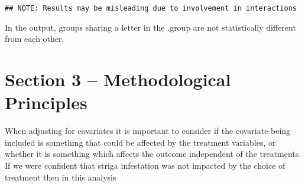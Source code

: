 \documentclass[]{book}
\theoremstyle{definition}
\theoremstyle{definition}
\theoremstyle{definition}
\theoremstyle{remark}
\begin{document}
\begin{verbatim}
## NOTE: Results may be misleading due to involvement in interactions
\end{verbatim}

In the output, groups sharing a letter in the .group are not
statistically different from each other.

\section{Section 3 -- Methodological
Principles}\label{section-3-methodological-principles-4}

When adjusting for covariates it is important to consider if the
covariate being included is something that could be affected by the
treatment variables, or whether it is something which affects the
outcome independent of the treatments. If we were confident that striga
infestation was not impacted by the choice of treatment then in this
analysis


\end{document}
